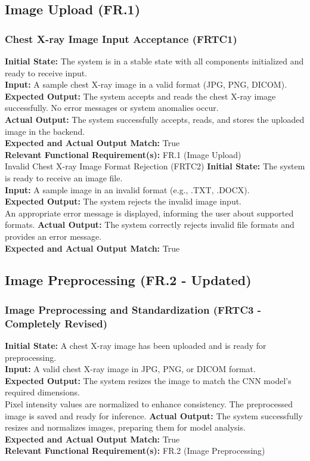 \documentclass[12pt, titlepage]{article}
\begin{document}
\subsection{Image Upload (FR.1)}
\subsubsection{Chest X-ray Image Input Acceptance (FRTC1)}
\textbf{Initial State:} The system is in a stable state with all components initialized and ready to receive input.\\
\textbf{Input:} A sample chest X-ray image in a valid format (JPG, PNG, DICOM).\\
\textbf{Expected Output:} The system accepts and reads the chest X-ray image successfully.
No error messages or system anomalies occur.\\
\textbf{Actual Output:} The system successfully accepts, reads, and stores the uploaded image in the backend.\\
\textbf{Expected and Actual Output Match:} True\\
\textbf{Relevant Functional Requirement(s):} FR.1 (Image Upload)\\

Invalid Chest X-ray Image Format Rejection (FRTC2)
\textbf{Initial State:} The system is ready to receive an image file.\\
\textbf{Input:} A sample image in an invalid format (e.g., .TXT, .DOCX).\\
\textbf{Expected Output:} The system rejects the invalid image input.\\
An appropriate error message is displayed, informing the user about supported formats.
\textbf{Actual Output:} The system correctly rejects invalid file formats and provides an error message.\\
\textbf{Expected and Actual Output Match:} True\\

\subsection{Image Preprocessing (FR.2 - Updated)}
\subsubsection{Image Preprocessing and Standardization (FRTC3 - Completely Revised)}
\textbf{Initial State:} A chest X-ray image has been uploaded and is ready for preprocessing.\\
\textbf{Input:} A valid chest X-ray image in JPG, PNG, or DICOM format.\\
\textbf{Expected Output:} The system resizes the image to match the CNN model’s required dimensions.\\
Pixel intensity values are normalized to enhance consistency.
The preprocessed image is saved and ready for inference.
\textbf{Actual Output:} The system successfully resizes and normalizes images, preparing them for model analysis.\\
\textbf{Expected and Actual Output Match:} True\\
\textbf{Relevant Functional Requirement(s):} FR.2 (Image Preprocessing)\\
\end{document}
